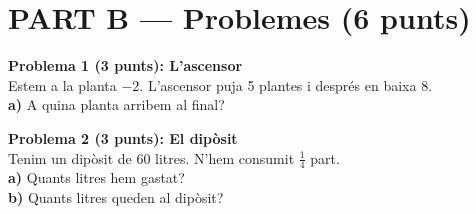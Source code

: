 \documentclass[a4paper, 11pt]{article}
\begin{document}
\newpage

\section*{PART B — Problemes (6 punts)}

\noindent\textbf{Problema 1 (3 punts): L'ascensor} \\
Estem a la planta $-2$. L'ascensor puja 5 plantes i després en baixa 8. \\
\textbf{a)} A quina planta arribem al final? \\
\vspace{4cm}

\noindent\textbf{Problema 2 (3 punts): El dipòsit} \\
Tenim un dipòsit de 60 litres. N'hem consumit $\frac{1}{4}$ part. \\
\textbf{a)} Quants litres hem gastat? \\
\vspace{4cm}
\textbf{b)} Quants litres queden al dipòsit? \\
\vspace{4cm}
\end{document}
